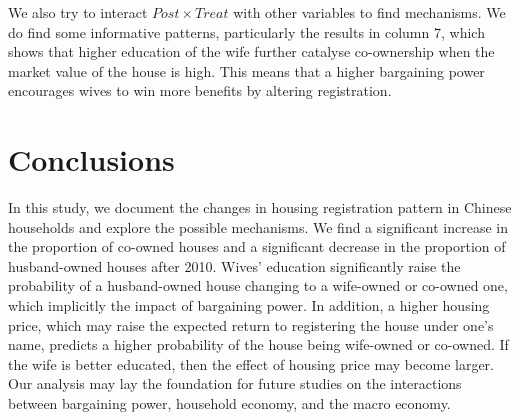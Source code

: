 \documentclass[11pt]{article}
\begin{document}
We also try to interact $Post\times Treat$ with other variables to find mechanisms. We do find some informative patterns, particularly the results in column 7, which shows that higher education of the wife further catalyse co-ownership when the market value of the house is high. This means that a higher bargaining power encourages wives to win more benefits by altering registration.

\section{Conclusions} \label{sec:conclusion}

In this study, we document the changes in housing registration pattern in Chinese households and explore the possible mechanisms. We find a significant increase in the proportion of co-owned houses and a significant decrease in the proportion of husband-owned houses after 2010. Wives' education significantly raise the probability of a husband-owned house changing to a wife-owned or co-owned one, which implicitly the impact of bargaining power. In addition, a higher housing price, which may raise the expected return to registering the house under one's name, predicts a higher probability of the house being wife-owned or co-owned. If the wife is better educated, then the effect of housing price may become larger. Our analysis may lay the foundation for future studies on the interactions between bargaining power, household economy, and the macro economy.

\singlespacing
\setlength\bibsep{0pt}



\end{document}
